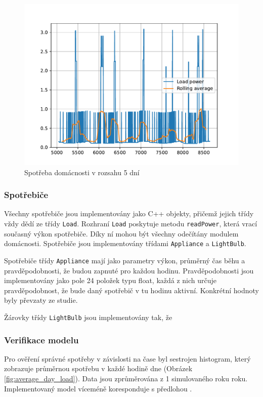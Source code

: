 \documentclass[12pt,a4paper]{article}
\begin{document}
\begin{figure}
\includegraphics[width=\linewidth]{img/load_power.pdf}
\caption{Spotřeba domácnosti v rozsahu 5 dní}
\label{fig:load_power}
\end{figure}

\subsubsection{Spotřebiče}
Všechny spotřebiče jsou implementovány jako C++ objekty, přičemž jejich třídy vždy dědí ze třídy \texttt{Load}.
Rozhraní \texttt{Load} poskytuje metodu \texttt{readPower}, která vrací současný výkon spotřebiče.
Díky ní mohou být všechny odečítány modulem domácnosti.
Spotřebiče jsou implementovány třídami \texttt{Appliance} a \texttt{LightBulb}.

Spotřebiče třídy \texttt{Appliance} mají jako parametry výkon, průměrný čas běhu a pravděpodobnosti, že budou zapnuté pro každou hodinu.
Pravděpodobnosti jsou implementovány jako pole 24 položek typu float,
každá z nich určuje pravděpodobnost, že bude daný spotřebič v tu hodinu aktivní.
Konkrétní hodnoty byly převzaty ze studie. \cite{TORRITI201737}

Žárovky třídy \texttt{LightBulb} jsou implementovány tak,
že

\subsubsection{Verifikace modelu}

Pro ověření správné spotřeby v závislosti na čase byl sestrojen histogram,
který zobrazuje průměrnou spotřebu v každé hodině dne (Obrázek \ref{fig:average_day_load}).
Data jsou zprůměrována z 1 simulovaného roku roku.
Implementovaný model víceméně koresponduje s předlohou \cite{TORRITI201737}.
\end{document}
